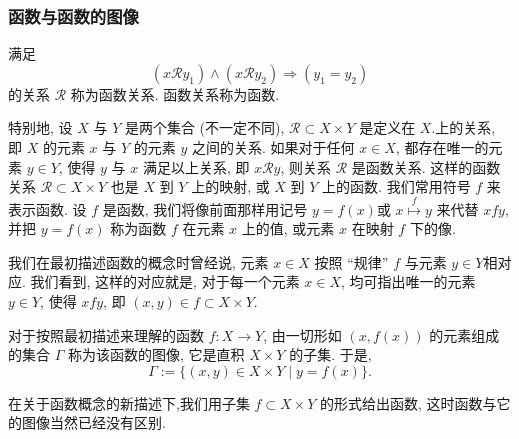 \documentclass{ctexart}
\begin{document}
\subsubsection{函数与函数的图像} 满足
$$
\left(x \mathcal{R} y_1\right) \wedge\left(x \mathcal{R} y_2\right) \Rightarrow\left(y_1=y_2\right)
$$
的关系 $\mathcal{R}$ 称为函数关系.
函数关系称为函数.

特别地, 设 $X$ 与 $Y$ 是两个集合 (不一定不同), $\mathcal{R} \subset X \times Y$ 是定义在 $X$.上的关系, 即 $X$ 的元素 $x$ 与 $Y$ 的元素 $y$ 之间的关系. 如果对于任何 $x \in X$, 都存在唯一的元素 $y \in Y$, 使得 $y$ 与 $x$ 满足以上关系, 即 $x \mathcal{R} y$, 则关系 $\mathcal{R}$ 是函数关系.
这样的函数关系 $\mathcal{R} \subset X \times Y$ 也是 $X$ 到 $Y$ 上的映射, 或 $X$ 到 $Y$ 上的函数.
我们常用符号 $f$ 来表示函数. 设 $f$ 是函数, 我们将像前面那样用记号 $y=f(x)$或 $x \stackrel{f}{\longmapsto} y$ 来代替 $x f y$, 并把 $y=f(x)$ 称为函数 $f$ 在元素 $x$ 上的值, 或元素 $x$ 在映射 $f$ 下的像.

我们在最初描述函数的概念时曾经说, 元素 $x \in X$ 按照 “规律” $f$ 与元素 $y \in Y$相对应. 我们看到, 这样的对应就是, 对于每一个元素 $x \in X$, 均可指出唯一的元素 $y \in Y$, 使得 $x f y$, 即 $(x, y) \in f \subset X \times Y$.

对于按照最初描述来理解的函数 $f: X \rightarrow Y$, 由一切形如 $(x, f(x))$ 的元素组成的集合 $\Gamma$ 称为该函数的图像, 它是直积 $X \times Y$ 的子集. 于是,
$$
\Gamma:=\{(x, y) \in X \times Y \mid y=f(x)\} .
$$

在关于函数概念的新描述下,我们用子集 $f \subset X \times Y$ 的形式给出函数, 这时函数与它的图像当然已经没有区别.



\end{document}
